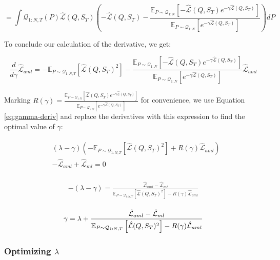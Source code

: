 \documentclass{article}
\theoremstyle{definition}
\newcommand{\Expect}[2]{\mathbb{E}_{#1}\left [#2 \right ]}
\begin{document}
$$=\int \mathcal{Q}_{1:N,T}(P)\hat{\mathcal{L}}(Q, S_T)\left (-\hat{\mathcal{L}}(Q,S_T)-
\frac{\Expect{P\sim \mathcal{Q}_{1:N}}{-\hat{\mathcal{L}}(Q,S_T)e^{-\gamma\hat{\mathcal{L}}(Q,S_T)} }}{\Expect{P\sim \mathcal{Q}_{1:N}}{e^{-\gamma\hat{\mathcal{L}}(Q,S_T)}}}\right)dP$$

To conclude our calculation of the derivative, we get:

$$\frac{d}{d\gamma}\hat{\mathcal{L}}_{aml}=-\Expect{P\sim \mathcal{Q}_{1:N,T}}{\hat{\mathcal{L}}(Q,S_T)^2}-\frac{\Expect{P\sim \mathcal{Q}_{1:N}}{-\hat{\mathcal{L}}(Q,S_T)e^{-\gamma\hat{\mathcal{L}}(Q,S_T)} }}{\Expect{P\sim \mathcal{Q}_{1:N}}{e^{-\gamma\hat{\mathcal{L}}(Q,S_T)}} }\hat{\mathcal{L}}_{aml} $$

Marking $R(\gamma)=\frac{\Expect{P\sim \mathcal{Q}_{1:N}}{\hat{\mathcal{L}}(Q,S_T)e^{-\gamma\hat{\mathcal{L}}(Q,S_T)} }}{\Expect{P\sim \mathcal{Q}_{1:N}}{e^{-\gamma\hat{\mathcal{L}}(Q,S_T)}} }$ for convenience, we use Equation \ref{eq:gamma-deriv} and replace the derivatives with this expression to find the optimal value of $\gamma$: 

\begin{align*} 
\begin{split}
&(\lambda-\gamma)\left (-\Expect{P\sim \mathcal{Q}_{1:N,T}}{\hat{\mathcal{L}}(Q,S_T)^2}+R(\gamma)\hat{\mathcal{L}}_{aml}\right )\\& - \hat{\mathcal{L}}_{aml}+\hat{\mathcal{L}}_{ml} = 0
\end{split}
\end{align*}

\begin{align*} 
\begin{split}
-(\lambda-\gamma) = \frac{\hat{\mathcal{L}}_{aml}-\hat{\mathcal{L}}_{ml}}{\Expect{P\sim \mathcal{Q}_{1:N,T}}{\hat{\mathcal{L}}(Q,S_T)^2}-R(\gamma)\hat{\mathcal{L}}_{aml}}
\end{split}
\end{align*}

\begin{align} \label{eq:meta-pb-gamma}
\begin{split}
\gamma = \lambda+\frac{\hat{\mathcal{L}}_{aml}-\hat{\mathcal{L}}_{ml}}{\Expect{P\sim \mathcal{Q}_{1:N,T}}{\hat{\mathcal{L}}(Q,S_T)^2}-R(\gamma)\hat{\mathcal{L}}_{aml}}
\end{split}\hfill
\end{align}

\subsubsection{Optimizing $\lambda$}
\end{document}
